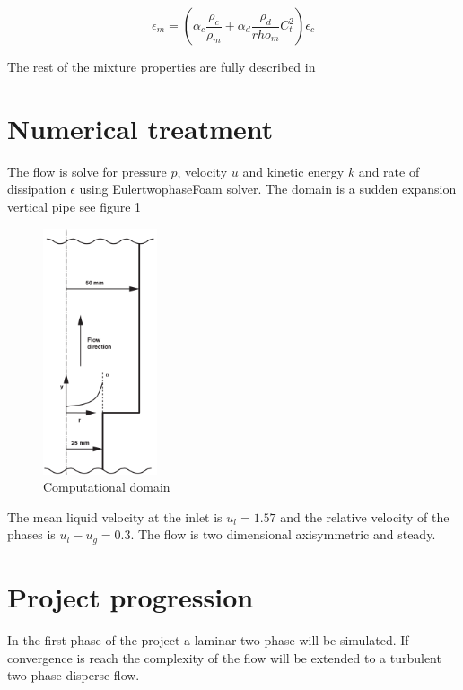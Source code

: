 \documentclass[
10pt, %
a4paper, %
oneside, %
headinclude,footinclude, %
BCOR5mm, %
]{scrartcl}
\begin{document}
\begin{equation}
\epsilon_{m} = \left(  \bar{\alpha}_{c} \frac{\rho_{c}}{\rho_{m}}+ \bar{\alpha}_{d}\frac{\rho_{d}}{rho_{m}}C_{t}^{2}   \right)\epsilon_{c} \nonumber
\end{equation}

The rest of the mixture properties are fully described in \cite{behzadi:2003}

\section{Numerical treatment}
The flow is solve for pressure $p$, velocity $u$ and kinetic energy $k$ and rate of dissipation $\epsilon$ using EulertwophaseFoam solver. The domain is a sudden expansion vertical pipe see figure 1


\begin{figure}[H]
  \caption{Computational domain}
  \centering
    \includegraphics[width=0.3\textwidth]{pipe.png}
\end{figure}

The mean liquid velocity at the inlet is $u_{l} =1.57$ and the relative velocity of the phases is $u_{l}-u_{g} = 0.3$. The flow is two dimensional axisymmetric and steady.

\section{Project progression}
In the first phase of the project a laminar two phase will be simulated. If convergence is reach the complexity of the flow will be extended to a turbulent two-phase disperse flow.

\renewcommand{\refname}{\spacedlowsmallcaps{References}} %




\end{document}
